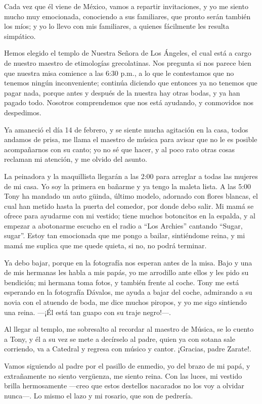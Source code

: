 \documentclass[letterpaper, 12pt]{book}
\begin{document}
Cada vez que él viene de México, vamos a repartir invitaciones, y yo me siento mucho muy emocionada, conociendo a sus familiares, que pronto serán también los míos; y yo lo llevo con mis familiares, a quienes fácilmente les resulta simpático.

Hemos elegido el templo de Nuestra Señora de Los Ángeles, el cual está a cargo de nuestro maestro de etimologías grecolatinas. Nos pregunta si nos parece bien que nuestra misa comience a las 6:30 p.m., a lo que le contestamos que no tenemos ningún inconveniente; continúa diciendo que entonces ya no tenemos que pagar nada, porque antes y después de la nuestra hay otras bodas, y ya han pagado todo. Nosotros comprendemos que nos está ayudando, y conmovidos nos despedimos.

Ya amaneció el día 14 de febrero, y se siente mucha agitación en la casa, todos andamos de prisa, me llama el maestro de música para avisar que no le es posible acompañarnos con su canto; yo no sé que hacer, y al poco rato otras cosas reclaman mi atención, y me olvido del asunto.

La peinadora y la maquillista llegarán a las 2:00 para arreglar a todas las mujeres de mi casa. Yo soy la primera en bañarme y ya tengo la maleta lista.  A las 5:00 Tony ha mandado un auto güinda, último modelo, adornado con flores blancas, el cual han metido hasta la puerta del comedor, por donde debo salir.  Mi mamá se ofrece para ayudarme con mi vestido; tiene muchos botoncitos en la espalda, y al empezar a abotonarme escucho en el radio a ``Los Archies'' cantando ``Sugar, sugar''. Estoy tan emocionada que me pongo a bailar, sintiéndome reina, y mi mamá me suplica que me quede quieta, si no, no podrá terminar.

Ya debo bajar, porque en la fotografía nos esperan antes de la misa. Bajo y una de mis hermanas les habla a mis papás, yo me arrodillo ante ellos y les pido su bendición; mi hermana toma fotos, y también frente al coche. Tony me está esperando en la fotografía Dávalos, me ayuda a bajar del coche, admirando a su novia con el atuendo de boda, me dice muchos piropos, y yo me sigo sintiendo una reina. ---¡Él está tan guapo con su traje negro!---.

Al llegar al templo, me sobresalto al recordar al maestro de Música, se lo cuento a Tony, y él a su vez se mete a decírselo al padre, quien ya con sotana sale corriendo, va a Catedral y regresa con músico y cantor. ¡Gracias, padre Zarate!.

Vamos siguiendo al padre por el pasillo de enmedio, yo del brazo de mi papá, y extrañamente no siento vergüenza, me siento reina. Con las luces, mi vestido brilla hermosamente ---creo que estos destellos nacarados no los voy a olvidar nunca---. Lo mismo el lazo y mi rosario, que son de pedrería.
\end{document}
